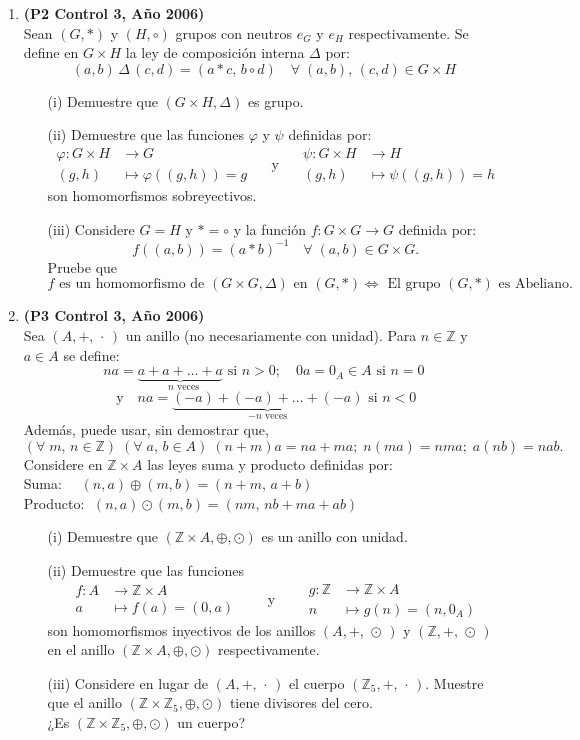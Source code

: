 \documentclass[11pt]{article}
\newcommand{\function}[5]{  \begin{array}{rl}
                                #1: #2 &\longrightarrow #3 \\
                                #4 & \longmapsto #1\left(#4\right)= #5
                            \end{array} }
\newcommand{\Z}{\mathbb Z}
\theoremstyle{plain}
\theoremstyle{definition}
\begin{document}
\begin{enumerate}
\item \textbf{(P2 Control 3, Año 2006)}\\
Sean $(G,*)$ y $(H,\circ)$ grupos con neutros $e_{G}$ y $e_{H}$ respectivamente. Se define en $G\times H$ la ley de composición interna $\Delta$ por:
$$(a,b)\,\Delta \,(c,d)=(a*c,\, b\circ d) \quad \forall\;(a,b),\,(c,d)\in G\times H$$
\begin{enumerate}
\item[(i)] Demuestre que $(G \times H, \Delta)$ es grupo.
\item[(ii)] Demuestre que las funciones $\varphi$ y $\psi$ definidas por:
$$\function{\varphi}{G\times H}{G}{(g,h)}{g} \quad \mbox{ y } \quad \function{\psi}{G\times H}{H}{(g,h)}{h}$$
son homomorfismos sobreyectivos.
\item[(iii)] Considere $G=H$ y $*=\circ$ y la función $f: G\times G \longrightarrow G$ definida por: $$f((a,b))=(a * b)^{-1} \quad \forall \; (a,b)\in G\times G.$$ Pruebe que
$$f \mbox{ es un homomorfismo de } (G\times G, \Delta) \mbox{ en } (G,*) \Longleftrightarrow \mbox{ El grupo $(G,*)$ es Abeliano.}$$
\end{enumerate}

\item \textbf{(P3 Control 3, Año 2006)}\\
Sea $(A,+,\,\cdot\,)$ un anillo (no necesariamente con unidad). Para $n\in\Z$ y $a\in A$ se define:
$$na=\underbrace{a+a+\ldots+a}_{\mbox{ $n$ veces}} \mbox{ si } n>0;\quad  0a=0_A\in A \mbox{ si } n=0$$
$$\mbox{ y}\quad  na=\underbrace{(-a)+(-a)+\ldots+(-a)}_{\mbox{$-n$ veces}} \mbox{ si } n<0$$
Además, puede usar, sin demostrar que, $$(\forall\;m,\,n\in \Z)\;(\forall\;a,\,b\in A)\; (n+m)a=na+ma;\; n(ma)=nma;\; a(nb)=nab.$$
Considere en $\Z\times A$ las leyes suma y producto definidas por:\\
Suma: $\quad (n,a)\oplus (m,b)=(n+m,\,a+b)$\\
Producto: $\; (n,a)\odot (m,b)=(nm,\,nb+ma+ab)$
\begin{enumerate}
\item[(i)] Demuestre que $(\Z\times A,\oplus, \odot)$ es un anillo con unidad.
\item[(ii)] Demuestre que las funciones
$$\function{f}{A}{\Z\times A}{a}{(0,a)} \qquad \mbox{y} \qquad \function{g}{\Z}{\Z\times A}{n}{(n,0_{A})}$$
son homomorfismos inyectivos de los anillos $(A,+,\,\odot\,)$ y $(\Z,+,\,\odot\,)$ en el anillo $(\Z\times A,\oplus, \odot)$ respectivamente.
\item[(iii)] Considere en lugar de $(A,+,\,\cdot\,)$ el cuerpo $(\Z_{5},+,\,\cdot\,)$. Muestre que el anillo $(\Z\times \Z_5, \oplus, \odot)$ tiene divisores del cero.\\
¿Es $(\Z\times \Z_5, \oplus, \odot)$ un cuerpo?
\end{enumerate} 


\end{enumerate}
\end{document}
